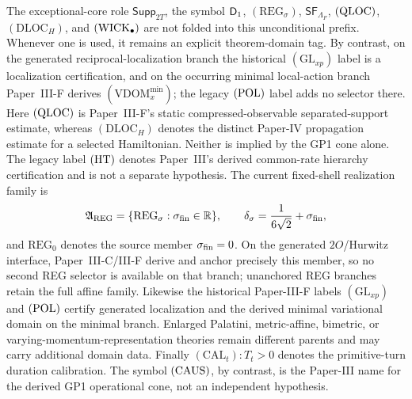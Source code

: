\documentclass[12pt,a4paper]{article}
\begin{document}
The exceptional-core role \(\mathsf{Supp}_{2T}\), the symbol \(\mathsf{D}_1\),
\((\mathrm{REG}_\sigma)\), \(\mathsf{SF}_{\Lambda_F}\), \(({\rm QLOC})\),
\((\mathrm{DLOC}_H)\), and \(({\rm WICK}_\bullet)\) are not folded into this
unconditional prefix.  Whenever one is used, it remains an explicit
theorem-domain tag.  By contrast, on the generated reciprocal-localization
branch the historical \((\mathrm{GL}_{xp})\) label is a localization
certification, and on the occurring minimal local-action branch
Paper~III-F derives \((\mathrm{VDOM}_x^{\min})\); the legacy
\(({\rm POL})\) label adds no selector there.  Here
\(({\rm QLOC})\) is Paper~III-F's static compressed-observable
separated-support estimate, whereas \((\mathrm{DLOC}_H)\) denotes the
distinct Paper-IV propagation estimate for a selected Hamiltonian.  Neither
is implied by the GP1 cone alone.  The legacy label \(({\rm HT})\) denotes
Paper~III's derived common-rate
hierarchy certification and is not a separate hypothesis.  The current
fixed-shell realization family is
\[
 \mathfrak A_{\rm REG}
 =\{\mathrm{REG}_\sigma:\sigma_{\rm fin}\in\mathbb R\},
 \qquad
 \delta_\sigma=\frac1{6\sqrt2}+\sigma_{\rm fin},
\]
and \(\mathrm{REG}_0\) denotes the source member
\(\sigma_{\rm fin}=0\).  On the generated \(2O\)/Hurwitz interface,
Paper~III-C/III-F derive and anchor precisely this member, so no second REG
selector is available on that branch; unanchored REG branches retain the
full affine family.  Likewise the historical Paper-III-F labels
\((\mathrm{GL}_{xp})\) and \(({\rm POL})\) certify generated localization
and the derived minimal variational domain on the minimal branch.  Enlarged
Palatini, metric-affine, bimetric, or varying-momentum-representation theories
remain different parents and may carry additional domain data.  Finally \((\mathrm{CAL}_t):T_t>0\) denotes the
primitive-turn duration calibration.  The symbol
\(({\rm CAUS})\), by contrast, is the
Paper-III name for the derived GP1 operational cone, not an independent
hypothesis.
\end{document}
